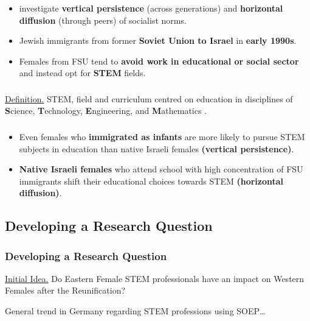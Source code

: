 \documentclass[11pt, aspectratio=1610, xcolor={dvipsnames}]{beamer}
\newcommand{\highlight}[1]{\textbf{\textcolor{PineGreen}{#1}}}
\begin{document}
	\begin{frame}
		\frametitle{}
		
		\begin{itemize}
			\item \cite{FriedmanSokuler2020} investigate \highlight{vertical persistence} (across generations) and \highlight{horizontal diffusion} (through peers) of socialist norms.
			\item Jewish immigrants from former \highlight{Soviet Union to Israel} in \highlight{early 1990s}.
			\item Females from FSU tend to \highlight{avoid work in educational or social sector} and instead opt for \highlight{STEM} fields.
		\end{itemize}
		
	\end{frame}
	
	\begin{frame}
		\frametitle{}
		
		\textcolor{PineGreen}{\underline{Definition.}} STEM, field and curriculum centred on education in disciplines of \textbf{S}cience, \textbf{T}echnology, \textbf{E}ngineering, and \textbf{M}athematics \textcolor{darkgray}{\citep{Hallinen2024}}.
		
	\end{frame}
	
	\begin{frame}
		\frametitle{}
		
		\begin{itemize}
			\item Even females who \highlight{immigrated as infants} are more likely to pursue STEM subjects in education than native Israeli females \highlight{(vertical persistence)}.
			\item \highlight{Native Israeli females} who attend school with high concentration of FSU immigrants shift their educational choices towards STEM \highlight{(horizontal diffusion)}.
		\end{itemize}
		
	\end{frame}
	
	\subsection{Developing a Research Question}
	\begin{frame}
		\frametitle{Developing a Research Question}
		
		\textcolor{PineGreen}{\underline{Initial Idea.}} Do Eastern Female STEM professionals have an impact on Western Females after the Reunification?
		
		\vspace{1cm}
		
		General trend in Germany regarding STEM professions using SOEP…
		
	\end{frame}
	
\end{document}
